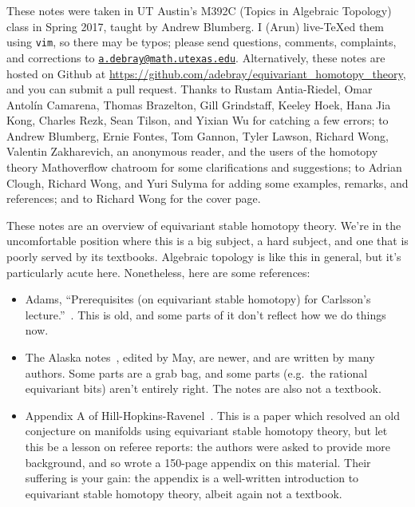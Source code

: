 
\versioninfo

These notes were taken in UT Austin’s M392C (Topics in Algebraic Topology) class in Spring 2017, taught by Andrew
Blumberg. I (Arun) live-\TeX ed them using \texttt{vim}, so there may be typos; please send questions, comments,
complaints, and corrections to
\href{mailto:a.debray@math.utexas.edu?subject=M392C\%20Lecture\%20Notes}{\texttt{a.debray@math.utexas.edu}}.
Alternatively, these notes are hosted on Github at \url{https://github.com/adebray/equivariant_homotopy_theory},
and you can submit a pull request. Thanks to Rustam Antia-Riedel, Omar Antolín Camarena, Thomas Brazelton, Gill
Grindstaff, Keeley Hoek, Hana Jia Kong, Charles Rezk, Sean Tilson, and Yixian Wu for catching a few errors; to
Andrew Blumberg, Ernie Fontes, Tom Gannon, Tyler Lawson, Richard Wong, Valentin Zakharevich, an anonymous reader,
and the users of the homotopy theory Mathoverflow chatroom for some clarifications and suggestions; to Adrian
Clough, Richard Wong, and Yuri Sulyma for adding some examples, remarks, and references; and to Richard Wong for
the cover page.


\orbreak

These notes are an overview of equivariant stable homotopy theory. We're in the uncomfortable position where this
is a big subject, a hard subject, and one that is poorly served by its textbooks. Algebraic topology is like this
in general, but it's particularly acute here. Nonetheless, here are some references:
\begin{itemize}
	\item Adams, ``Prerequisites (on equivariant stable homotopy) for Carlsson's lecture.''~\cite{Adams84}. This is
	old, and some parts of it don't reflect how we do things now.
	\item The Alaska notes~\cite{AlaskaNotes}, edited by May, are newer, and are written by many authors. Some
	parts are a grab bag, and some parts (e.g.\ the rational equivariant bits) aren't entirely right. The notes are
	also not a textbook.
	\item Appendix A of Hill-Hopkins-Ravenel~\cite{HHR}. This is a paper which resolved an old conjecture on
	manifolds using equivariant stable homotopy theory, but let this be a lesson on referee reports: the authors
	were asked to provide more background, and so wrote a 150-page appendix on this material. Their suffering is
	your gain: the appendix is a well-written introduction to equivariant stable homotopy theory, albeit again not
	a textbook.
\end{itemize}

